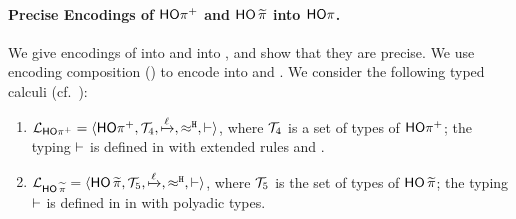 \documentclass[runningheads]{llncs}
\begin{document}
{{%
\paragraph{Precise Encodings of $\mathsf{HO\pi^{+}}$ and $\mathsf{HO}\,{\widetilde{\pi}}$ into $\mathsf{HO}\pi$.}
We give  %
encodings of \HOpp into \HOp
and into \PHOp, and show that they are precise. 
We use encoding composition () to encode
\PHOpp into \HO and \sessp.
We consider the following 
typed calculi (cf.~):
\begin{enumerate}[-]
\item $\mathcal{L}_{\mathsf{HO\pi^{+}}}=\langle \mathsf{HO\pi^{+}}, {\cal{T}}_4, \xmapsto{\ell}, \approx^\mathtt{H}, \vdash \rangle$,
where 
	${\cal{T}}_4$ is a set of types of $\mathsf{HO\pi^{+}}$;  
the typing $\vdash$ is defined in 
with extended rules  and .

\item 
	$\mathcal{L}_{\mathsf{HO}\,{\widetilde{\pi}}}=\langle \mathsf{HO}\,{\widetilde{\pi}}, {\cal{T}}_5, \xmapsto{\ell}, \approx^\mathtt{H}, \vdash \rangle$,
where 
	${\cal{T}}_5$ is the set of types of $\mathsf{HO}\,{\widetilde{\pi}}$;  
the typing $\vdash$ is defined in
in 
with polyadic types.
\end{enumerate}

%

}}
\end{document}
